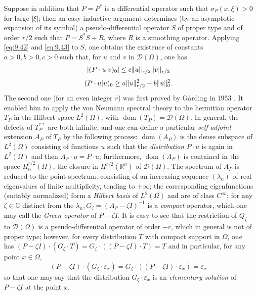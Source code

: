 \documentclass[12pt,a4paper,leqno,twoside]{extbook}
\DeclarePairedDelimiter{\norm}{\lVert}{\rVert}
\newcommand{\C}{\mathbb{C}}
\newcommand{\R}{\mathbb{R}}
\newcommand{\dom}{\operatorname{dom}}
\begin{document}
Suppose in addition that \(P = P^*\) is a differential operator such that \(\sigma_P(x,\xi) > 0\) for large \(|\xi|\); then an easy inductive argument determines (by an asymptotic expansion of its symbol) a pseudo-differential operator \(S\) of proper type and of order \(r/2\) such that \(P = S^* S + R\), where \(R\) is a smoothing operator. Applying \eqref{eq:9.42} and \eqref{eq:9.43} to \(S\), one obtains the existence of constants \(a > 0, b > 0, c > 0\) such that, for \(u\) and \(v\) in \(\mathcal{D}(\Omega)\), one has
\begin{equation}
    \label{eq:9.44}
    |(P \cdot u | v)_0| \leq c \norm{u}_{r/2} \norm{v}_{r/2}
\end{equation}
\begin{equation}
    \label{eq:9.45}
    (P \cdot u | u)_0 \geq a \norm{u}^2_{r/2} - b \norm{u}^2_0.
\end{equation}
The second one (for an even integer \(r\)) was first proved by Gårding in 1953 \cite{080}. It enabled him to apply the von Neumann spectral theory to the hermitian operator \(T_P\) in the Hilbert space \(L^2(\Omega)\), with \(\dom(T_P) = \mathcal{D}(\Omega)\). In general, the defects of \(T^{**}_P\) are both infinite, and one can define a particular \emph{self-adjoint} extension \(A_P\) of \(T_P\) by the following process: \(\dom(A_P)\) is the dense subspace of \(L^2(\Omega)\) consisting of functions \(u\) such that the \emph{distribution} \(P \cdot u\) is again in \(L^2(\Omega)\) and then \(A_P \cdot u = P \cdot u\); furthermore, \(\dom(A_P)\) is contained in the space \(H^{r/2}_0(\Omega)\), the closure in \(H^{r/2}(\R^n)\) of \(\mathcal{D}(\Omega)\). The spectrum of \(A_P\) is reduced to the point spectrum, consisting of an increasing sequence \((\lambda_n)\) of real eigenvalues of finite multiplicity, tending to \(+\infty\); the corresponding eigenfunctions (suitably normalized) form a \emph{Hilbert basis} of \(L^2(\Omega)\) and are of class \(C^\infty\); for any \(\zeta \in \C\) distinct from the \(\lambda_n, G_\zeta = (A_P - \zeta I)^{-1}\) is a \emph{compact} operator, which one may call the \emph{Green operator} of \(P - \zeta I\). It is easy to see that the restriction of \(Q_\zeta\) to \(\mathcal{D}(\Omega)\) is a pseudo-differential operator of order \(-r\), which in general is not of proper type; however, for every distribution \(T\) with compact support in \(\Omega\), one has \((P-\zeta I) \cdot (G_\zeta \cdot T) = G_\zeta \cdot ((P - \zeta I) \cdot T) = T\) and in particular, for any point \(x \in \Omega\),
\begin{equation}
    \label{eq:9.46}
    (P - \zeta I) \cdot (G_\zeta \cdot \varepsilon_x) = G_\zeta \cdot ((P - \zeta I) \cdot \varepsilon_x) = \varepsilon_x
\end{equation}
so that one may say that the distribution \(G_\zeta \cdot \varepsilon_x\) is an \emph{elementary solution} of \(P - \zeta I\) at the point \(x\).
\end{document}
